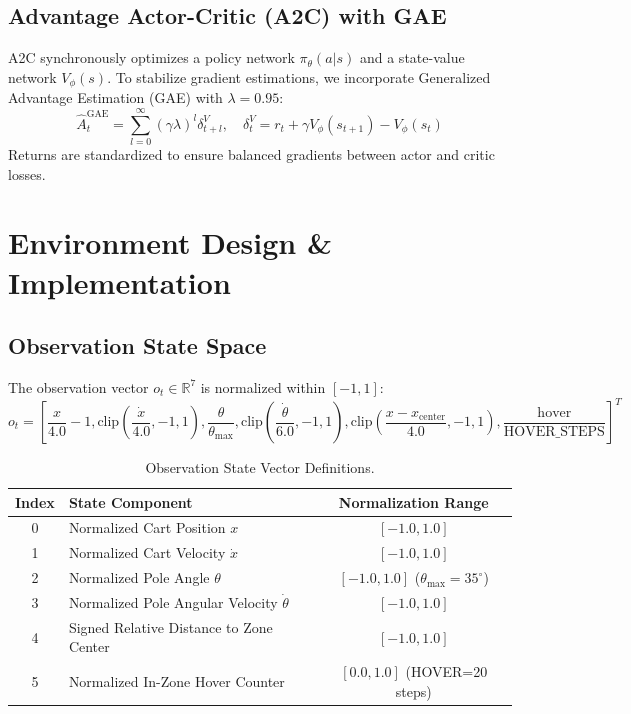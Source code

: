 \documentclass[journal,twocolumn]{IEEEtran}
\begin{document}
\subsection{Advantage Actor-Critic (A2C) with GAE}
A2C synchronously optimizes a policy network $\pi_\theta(a|s)$ and a state-value network $V_\phi(s)$. To stabilize gradient estimations, we incorporate Generalized Advantage Estimation (GAE) with $\lambda = 0.95$:
\begin{equation}
\hat{A}_t^{\text{GAE}} = \sum_{l=0}^{\infty} (\gamma \lambda)^l \delta_{t+l}^V, \quad \delta_t^V = r_t + \gamma V_\phi(s_{t+1}) - V_\phi(s_t)
\end{equation}
Returns are standardized to ensure balanced gradients between actor and critic losses.

\section{Environment Design \& Implementation}

\subsection{Observation State Space}
The observation vector $o_t \in \mathbb{R}^7$ is normalized within $[-1, 1]$:
\begin{equation}
o_t = \left[ \frac{x}{4.0}-1, \text{clip}\left(\frac{\dot{x}}{4.0}, -1, 1\right), \frac{\theta}{\theta_{\text{max}}}, \text{clip}\left(\frac{\dot{\theta}}{6.0}, -1, 1\right), \text{clip}\left(\frac{x - x_{\text{center}}}{4.0}, -1, 1\right), \frac{\text{hover}}{\text{HOVER\_STEPS}} \right]^T
\end{equation}

\begin{table}[htbp]
\centering
\caption{Observation State Vector Definitions.}
\label{tab:obs_space}
\begin{tabular}{clc}
\toprule
\textbf{Index} & \textbf{State Component} & \textbf{Normalization Range} \\ 
\midrule
0 & Normalized Cart Position $x$ & $[-1.0, 1.0]$ \\
1 & Normalized Cart Velocity $\dot{x}$ & $[-1.0, 1.0]$ \\
2 & Normalized Pole Angle $\theta$ & $[-1.0, 1.0]$ ($\theta_{\text{max}} = 35^\circ$) \\
3 & Normalized Pole Angular Velocity $\dot{\theta}$ & $[-1.0, 1.0]$ \\
4 & Signed Relative Distance to Zone Center & $[-1.0, 1.0]$ \\
5 & Normalized In-Zone Hover Counter & $[0.0, 1.0]$ (HOVER=20 steps) \\
\bottomrule
\end{tabular}
\end{table}
\end{document}
